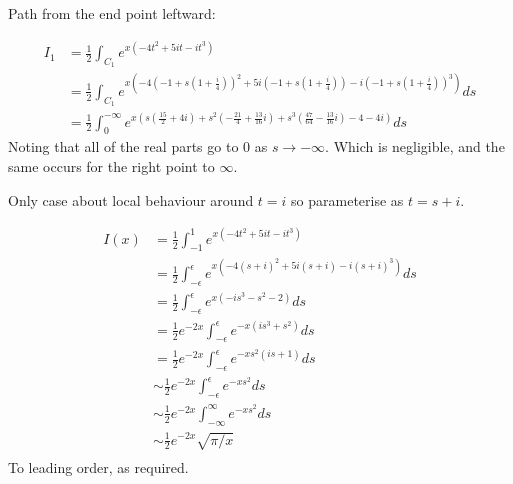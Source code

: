 \documentclass{X:/Documents/Coding/Latex/myassignment}
\begin{document}
\begin{enumerate}
	Path from the end point leftward:

	\begin{align*}
		I_1&=\frac12 \int_{C_1} e^{x\left(-4t^2+5it-it^3\right)}\\
		&=\frac12 \int_{C_1} e^{x\left(-4(-1 + s(1+\frac{i}4))^2+5i(-1 + s(1+\frac{i}4))-i(-1 + s(1+\frac{i}4))^3\right)} ds\\
		&=\frac12 \int_{0}^{-\infty} e^{x\left(s\left(\frac{15}{2}+4i\right)+s^2\left(-\frac{21}{4}+\frac{13}{16}i\right)+s^3\left(\frac{47}{64}-\frac{13}{16}i\right)-4-4i\right)} ds
	\end{align*}
	Noting that all of the real parts go to $0$ as $s\to -\infty$. Which is negligible, and the same occurs for the right point to $\infty$.


	Only case about local behaviour around $t=i$ so parameterise as $t = s+i$.

	\begin{align*}
		I(x) &= \frac12 \int_{-1}^{1} e^{x\left(-4t^2+5it-it^3\right)}\\
			&=\frac12 \int_{-\epsilon}^{\epsilon} e^{x\left(-4(s+i)^2+5i(s+i)-i(s+i)^3\right)}ds\\
			&= \frac12 \int_{-\epsilon}^{\epsilon} e^{x(- is^3 - s^2 - 2)}ds\\
			&= \frac12 e^{-2x} \int_{-\epsilon}^{\epsilon} e^{-x(is^3 + s^2)}ds\\
			&= \frac12 e^{-2x} \int_{-\epsilon}^{\epsilon} e^{-xs^2(is +1)}ds\\
			&\sim \frac12 e^{-2x} \int_{-\epsilon}^{\epsilon} e^{-xs^2}ds\\
			&\sim \frac12 e^{-2x} \int_{-\infty}^{\infty} e^{-xs^2}ds\\
			&\sim \frac12 e^{-2x} \sqrt{\pi/x}\\
	\end{align*}
	To leading order, as required.







\end{enumerate}

\clearpage

\end{document}
